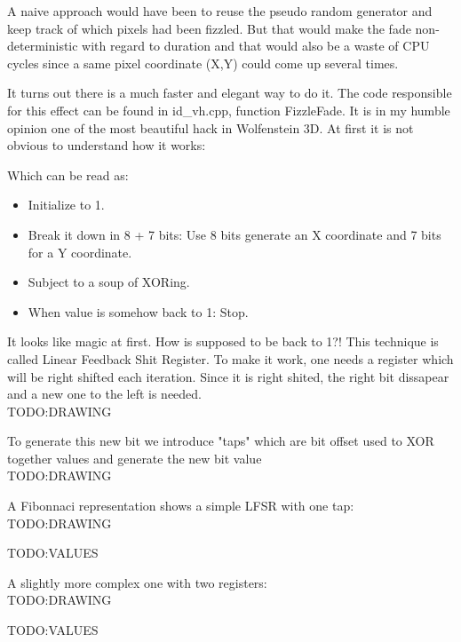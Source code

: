 A naive approach would have been to reuse the pseudo random generator  and keep track of which pixels had been fizzled. But that would make the fade non-deterministic with regard to duration and that would also be a waste of CPU cycles since a same pixel coordinate (X,Y) could come up several times.\\
\par
It turns out there is a much faster and elegant way to do it. The code responsible for this effect can be found in id\_vh.cpp, function FizzleFade. It is in my humble opinion one of the most beautiful hack in Wolfenstein 3D. At first it is not obvious to understand how it works:\\
\par
\begin{minipage}{\textwidth}

\end{minipage}
\par
Which can be read as:\\
\begin{itemize}
\item Initialize  to 1.
\item Break it down in 8 + 7 bits: Use 8 bits generate an X coordinate and 7 bits for a Y coordinate.
\item Subject  to a soup of XORing.
\item When  value is somehow back to 1: Stop.
\end{itemize}        
It looks like magic at first. How is  supposed to be back to 1?! This technique is called Linear Feedback Shit Register. To make it work, one needs a register which will be right shifted each iteration. Since it is right shited, the right bit dissapear and a new one to the left is needed.\\
TODO:DRAWING\\
\par
To generate this new bit we introduce "taps" which are bit offset used to XOR together values and generate the new bit value\\
TODO:DRAWING\\
\par
A Fibonnaci representation shows a simple LFSR with one tap:\\
TODO:DRAWING\\
\par
TODO:VALUES\\
\par
A slightly more complex one with two registers:\\
TODO:DRAWING\\
\par
TODO:VALUES\\


